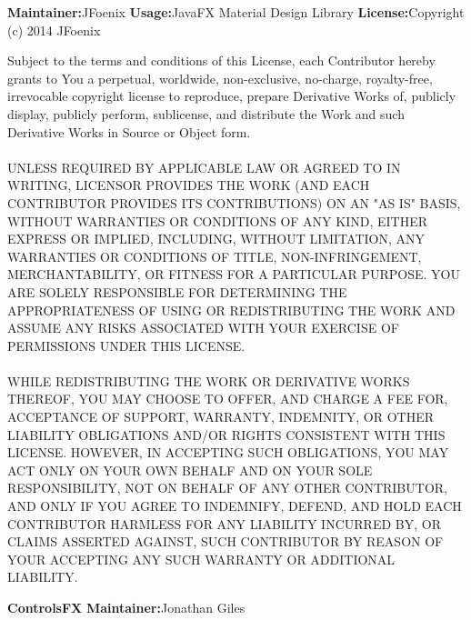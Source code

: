{\bfseries Maintainer:}{\space JFoenix}
\newline
\newline
{\bfseries Usage:}{\space JavaFX Material Design Library}
\newline
\newline
{\bfseries License:}{\space Copyright (c) 2014 JFoenix}
\newline
\begin{addmargin}[4.5em]{0em}
    \fontsize{10pt}{12pt}\selectfont
    Subject to the terms and conditions of this License, each Contributor hereby grants to
    You a perpetual, worldwide, non-exclusive, no-charge, royalty-free, irrevocable copyright
    license to reproduce, prepare Derivative Works of, publicly display, publicly perform,
    sublicense, and distribute the Work and such Derivative Works in Source or Object form.
    \\ \\
    \uppercase{Unless required by applicable law or agreed to in writing,
    Licensor provides the Work (and each Contributor provides its Contributions)
    on an "AS IS" BASIS, WITHOUT WARRANTIES OR CONDITIONS OF ANY KIND, either express
    or implied, including, without limitation, any warranties or conditions of TITLE,
    NON-INFRINGEMENT, MERCHANTABILITY, or FITNESS FOR A PARTICULAR PURPOSE. You are
    solely responsible for determining the appropriateness of using or redistributing
    the Work and assume any risks associated with Your exercise of permissions under
    this License.
    \\ \\
    While redistributing the Work or Derivative Works thereof, You may choose to offer,
    and charge a fee for, acceptance of support, warranty, indemnity, or other liability
    obligations and/or rights consistent with this License. However, in accepting such
    obligations, You may act only on Your own behalf and on Your sole responsibility,
    not on behalf of any other Contributor, and only if You agree to indemnify, defend,
    and hold each Contributor harmless for any liability incurred by, or claims asserted
    against, such Contributor by reason of your accepting any such warranty or additional
    liability.}
\end{addmargin}
\newpage
{\bfseries ControlsFX}
\newline
\newline
{\bfseries Maintainer:}{\space Jonathan Giles}
\newline
\newline
